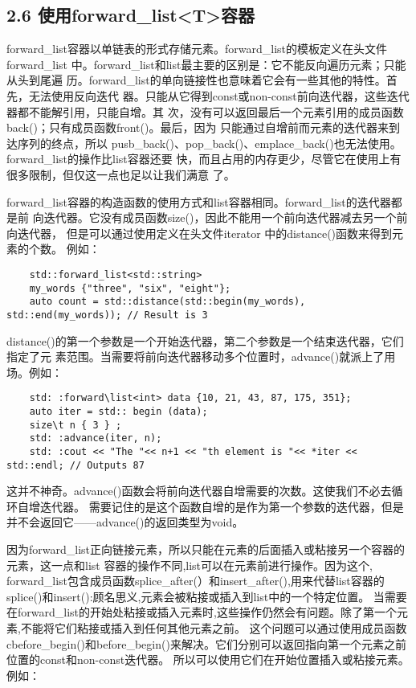 \subsection{2.6 使用forward\_list<T>容器}
forward\_list容器以单链表的形式存储元素。forward\_list的模板定义在头文件forward\_list
中。forward\_list和list最主要的区别是：它不能反向遍历元素；只能从头到尾遍
历。forward\_list的单向链接性也意味着它会有一些其他的特性。首先，无法使用反向迭代
器。只能从它得到const或non-const前向迭代器，这些迭代器都不能解引用，只能自增。其
次，没有可以返回最后一个元素引用的成员函数back()；只有成员函数front()。最后，因为
只能通过自增前而元素的迭代器来到达序列的终点，所以
pusb\_back()、pop\_back()、emplace\_back()也无法使用。forward\_list的操作比list容器还要
快，而且占用的内存更少，尽管它在使用上有很多限制，但仅这一点也足以让我们满意
了。

forward\_list容器的构造函数的使用方式和list容器相同。forward\_list的迭代器都是前
向迭代器。它没有成员函数size()，因此不能用一个前向迭代器减去另一个前向迭代器，
但是可以通过使用定义在头文件iterator 中的distance()函数来得到元素的个数。 例如：

\begin{verbatim}
	std::forward_list<std::string> 
	my_words {"three", "six", "eight"};
	auto count = std::distance(std::begin(my_words), std::end(my_words)); // Result is 3
\end{verbatim}

distance()的第一个参数是一个开始迭代器，第二个参数是一个结束迭代器，它们指定了元
素范围。当需要将前向迭代器移动多个位置时，advance()就派上了用场。例如：

\begin{verbatim}
	std: :forward\list<int> data {10, 21, 43, 87, 175, 351};
	auto iter = std:: begin (data);	
	size\t n { 3 } ;
	std: :advance(iter, n);
	std: :cout << "The "<< n+1 << "th element is "<< *iter << std::endl; // Outputs 87
\end{verbatim}

这并不神奇。advance()函数会将前向迭代器自增需要的次数。这使我们不必去循环自增迭代器。
需要记住的是这个函数自增的是作为第一个参数的迭代器，但是并不会返回它——advance()的返回类型为void。

因为forward\_list正向链接元素，所以只能在元素的后面插入或粘接另一个容器的元素，这一点和list 容器的操作不同,list可以在元素前进行操作。因为这个, forward\_list包含成员函数splice\_after(）和insert\_after(),用来代替list容器的splice()和insert():顾名思义,元素会被粘接或插入到list中的一个特定位置。
当需要在forward\_list的开始处粘接或插入元素时,这些操作仍然会有问题。除了第一个元素,不能将它们粘接或插入到任何其他元素之前。
这个问题可以通过使用成员函数cbefore\_begin()和before\_begin()来解决。它们分别可以返回指向第一个元素之前位置的const和non-const迭代器。
所以可以使用它们在开始位置插入或粘接元素。例如：

